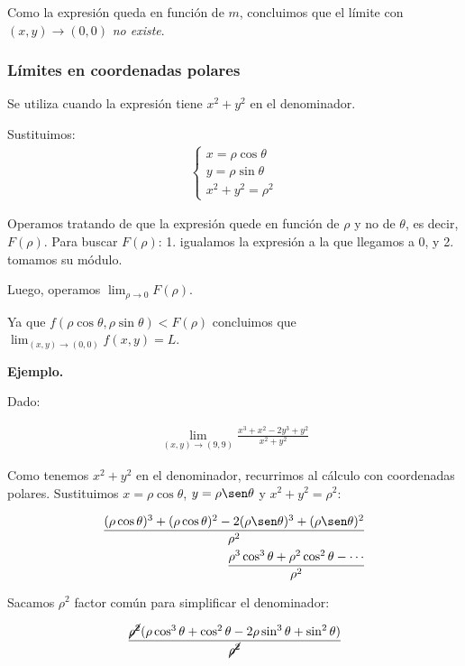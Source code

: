 Como la expresión queda en función de \(m\),
concluimos que el límite con \((x,y) \to (0,0)\) \textit{no existe}.

\subsubsection{Límites en coordenadas polares}

Se utiliza cuando la expresión tiene \(x^{2} + y^{2}\) en el denominador.

Sustituimos:
\begin{align*}
    \begin{cases}
        x = \rho \cos\theta \\
        y = \rho \sin\theta \\
        x^{2} + y^{2} = \rho^{2}
    \end{cases}
\end{align*}

Operamos tratando de que la expresión quede en función de \(\rho\)
y no de \(\theta\),
es decir,
\(F(\rho)\).
Para buscar \(F(\rho)\):
1. igualamos la expresión a la que llegamos a 0,
y 2. tomamos su módulo.

Luego, operamos \(\lim_{\rho\to0} F(\rho)\).

Ya que
\(f(\rho\cos\theta,\rho\sin\theta) < F(\rho)\)
concluimos que \(\lim_{(x,y)\to(0,0)}f(x,y) = L\).

\vspace{.5cm}
\textbf{Ejemplo.}

Dado:

\begin{align*}
    \lim_{(x,y)\to(9,9)}\frac{x^{3} + x^{2} - 2y^{3} + y^{2}}{x^{2} + y^{2}}
\end{align*}

Como tenemos \(x^{2} + y^{2}\) en el denominador,
recurrimos al cálculo con coordenadas polares.
Sustituimos \(x = \rho\cos\theta\),
\(y = \rho\sen\theta\) y \(x^{2} + y^{2} = \rho^{2}\):

\begin{align*}
    \frac{(\rho\cos\theta)^{3} + (\rho\cos\theta)^{2} - 2(\rho\sen\theta)^{3} +
    (\rho\sen\theta)^{2}}{\rho^{2}} \\
    \frac{\rho^{3}\cos^{3}\theta + \rho^{2}\cos^{2}\theta - \cdots}{\rho^{2}}
\end{align*}

Sacamos \(\rho^{2}\) factor común para simplificar el denominador:

\begin{equation*}
    \frac{\cancel{\rho^{2}}(\rho\cos^{3}\theta + \cos^{2}\theta - 2\rho\sin^{3}\theta + \sin^{2}\theta)}{\cancel{\rho^{2}}}
\end{equation*}

